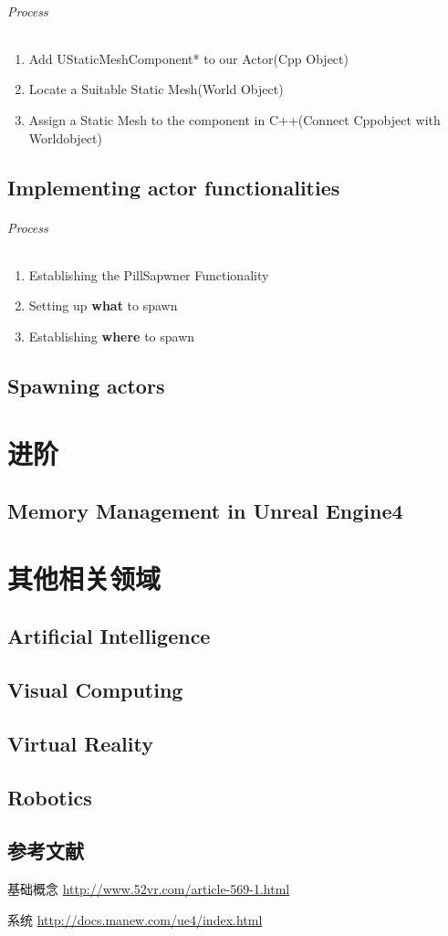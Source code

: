 \documentclass[UTF8,a4paper,12pt]{ctexbook}
\begin{document}
		\subparagraph{Process}	
			\begin{enumerate}[itemindent = 2em]
				\item Add UStaticMeshComponent* to our Actor(Cpp Object)
				\item Locate a Suitable Static Mesh(World Object)
				\item Assign a Static Mesh to the component in C++(Connect Cppobject with Worldobject)
			\end{enumerate}

		
		
	\section{Implementing actor functionalities}
		\subparagraph{Process}
			\begin{enumerate}[itemindent = 2em]
				\item Establishing the PillSapwner Functionality
				\item Setting up \textbf{what} to spawn
				\item Establishing \textbf{where} to spawn
			\end{enumerate}
	
	
	\section{Spawning actors}
	
	
	


\chapter{进阶}
	
	\section{Memory Management in Unreal Engine4}
	


	
\chapter{其他相关领域}
	\section{Artificial Intelligence}	
	
	\section{Visual Computing}	
	
	\section{Virtual Reality}
	
	\section{Robotics}
	
	\section{参考文献} 
	
		基础概念 \url{http://www.52vr.com/article-569-1.html}
		
		系统 \url{http://docs.manew.com/ue4/index.html}
	    
\end{document}
